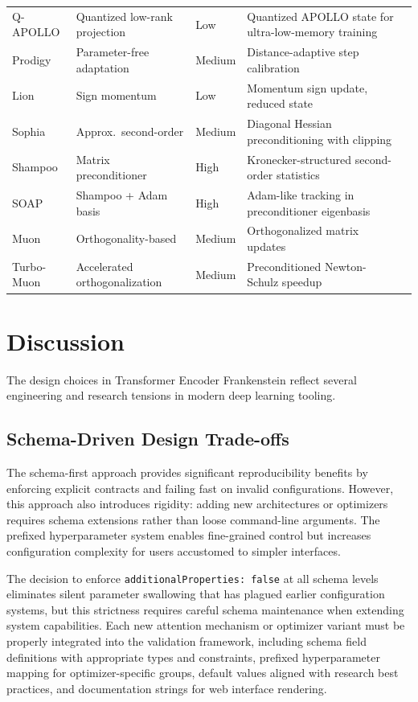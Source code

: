 \documentclass[11pt,a4paper]{article}
\begin{document}
\begin{longtable}{p{2.2cm}p{2.8cm}p{2.0cm}p{5.4cm}p{1.8cm}}
Q-APOLLO & Quantized low-rank projection & Low & Quantized APOLLO state for ultra-low-memory training & \citep{zhu2025apollosgdlikememoryadamwlevel} \\
Prodigy & Parameter-free adaptation & Medium & Distance-adaptive step calibration & \citep{mishchenko_prodigy_2023} \\
Lion & Sign momentum & Low & Momentum sign update, reduced state & \citep{chen_symbolic_2023} \\
Sophia & Approx.\ second-order & Medium & Diagonal Hessian preconditioning with clipping & \citep{liu_sophia_2023} \\
Shampoo & Matrix preconditioner & High & Kronecker-structured second-order statistics & \citep{gupta_shampoo_2018} \\
SOAP & Shampoo + Adam basis & High & Adam-like tracking in preconditioner eigenbasis & \citep{vyas_soap_2024} \\
Muon & Orthogonality-based & Medium & Orthogonalized matrix updates & \citep{shen_convergence_2025} \\
Turbo-Muon & Accelerated orthogonalization & Medium & Preconditioned Newton-Schulz speedup & \citep{boissin_turbo-muon_2025} \\
\bottomrule
\end{longtable}
\normalsize

\section{Discussion}
\label{sec:discussion}

The design choices in Transformer Encoder Frankenstein reflect several engineering and research tensions in modern deep learning tooling.

\subsection{Schema-Driven Design Trade-offs}

The schema-first approach provides significant reproducibility benefits by enforcing explicit contracts and failing fast on invalid configurations. However, this approach also introduces rigidity: adding new architectures or optimizers requires schema extensions rather than loose command-line arguments. The prefixed hyperparameter system enables fine-grained control but increases configuration complexity for users accustomed to simpler interfaces.

The decision to enforce \texttt{additionalProperties: false} at all schema levels eliminates silent parameter swallowing that has plagued earlier configuration systems, but this strictness requires careful schema maintenance when extending system capabilities. Each new attention mechanism or optimizer variant must be properly integrated into the validation framework, including schema field definitions with appropriate types and constraints, prefixed hyperparameter mapping for optimizer-specific groups, default values aligned with research best practices, and documentation strings for web interface rendering.
\end{document}
